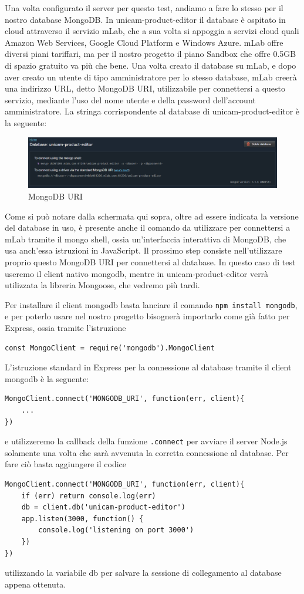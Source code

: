 Una volta configurato il server per questo test, andiamo a fare lo stesso per il nostro database MongoDB.
In unicam-product-editor il database è ospitato in cloud attraverso il servizio mLab, che a sua volta si appoggia a servizi cloud quali Amazon Web Services, Google Cloud Platform e Windows Azure. mLab offre diversi piani tariffari, ma per il nostro progetto il piano Sandbox che offre 0.5GB di spazio gratuito va più che bene. Una volta creato il database su mLab, e dopo aver creato un utente di tipo amministratore per lo stesso database, mLab creerà una indirizzo URL, detto MongoDB URI, utilizzabile per connettersi a questo servizio, mediante l'uso del nome utente e della password dell'account amministratore. 
\newpage
La stringa corrispondente al database di unicam-product-editor è la seguente:
\begin{figure}[h]
	\centering
	\includegraphics[scale=0.5]{Immagini/mongodb_uri.png}
	\caption{MongoDB URI}
\end{figure}

Come si può notare dalla schermata qui sopra, oltre ad essere indicata la versione del database in uso, è presente anche il comando da utilizzare per connettersi a mLab tramite il mongo shell, ossia un'interfaccia interattiva di MongoDB, che usa anch'essa istruzioni in JavaScript.
Il prossimo step consiste nell'utilizzare proprio questo MongoDB URI per connettersi al database. In questo caso di test useremo il client nativo mongodb, mentre in unicam-product-editor verrà utilizzata la libreria Mongoose, che vedremo più tardi.

Per installare il client mongodb basta lanciare il comando \texttt{npm install mongodb}, e per poterlo usare nel nostro progetto bisognerà importarlo come già fatto per Express, ossia tramite l'istruzione
\begin{lstlisting}[style=javaScriptCode]
const MongoClient = require('mongodb').MongoClient
\end{lstlisting}
L'istruzione standard in Express per la connessione al database tramite il client mongodb è la seguente:
\begin{lstlisting}[style=javaScriptCode]
MongoClient.connect('MONGODB_URI', function(err, client){
	...
})
\end{lstlisting}
e utilizzeremo la callback della funzione \texttt{.connect} per avviare il server Node.js solamente una volta che sarà avvenuta la corretta connessione al database. Per fare ciò basta aggiungere il codice
\begin{lstlisting}[caption={connessione a mongodb}, style=javaScriptCode]
MongoClient.connect('MONGODB_URI', function(err, client){
	if (err) return console.log(err)
	db = client.db('unicam-product-editor')
	app.listen(3000, function() {
		console.log('listening on port 3000')
	})
})
\end{lstlisting}
utilizzando la variabile db per salvare la sessione di collegamento al database appena ottenuta.

